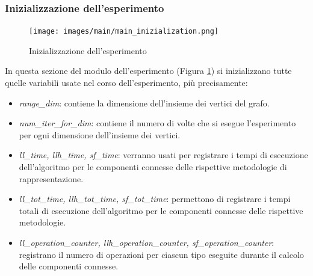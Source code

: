 \documentclass[12pt]{article}
\begin{document}
\subsubsection{Inizializzazione dell'esperimento}
\begin{figure}[h]
    \centering
    \texttt{[image: images/main/main\_inizialization.png]}
    \caption{Inizializzazione dell'esperimento}
    \label{fig:main_init}
\end{figure}
In questa sezione del modulo dell'esperimento (Figura \ref{fig:main_init}) si inizializzano tutte quelle variabili usate nel corso dell'esperimento, più precisamente:
\begin{itemize}
    \item \textit{range\_dim}: contiene la dimensione dell'insieme dei vertici del grafo.
    \item \textit{num\_iter\_for\_dim}: contiene il numero di volte che si esegue l'esperimento per ogni dimensione dell'insieme dei vertici.
    \item \textit{ll\_time, llh\_time, sf\_time}: verranno usati per registrare i tempi di esecuzione  dell'algoritmo per le componenti connesse delle rispettive metodologie di rappresentazione.
    \item \textit{ll\_tot\_time, llh\_tot\_time, sf\_tot\_time}: permettono di registrare i tempi totali di esecuzione dell'algoritmo per le componenti connesse delle rispettive metodologie.
    \item \textit{ll\_operation\_counter, llh\_operation\_counter, sf\_operation\_counter}: registrano il numero di operazioni per ciascun tipo eseguite durante il calcolo delle componenti connesse.
\end{itemize}
\end{document}
